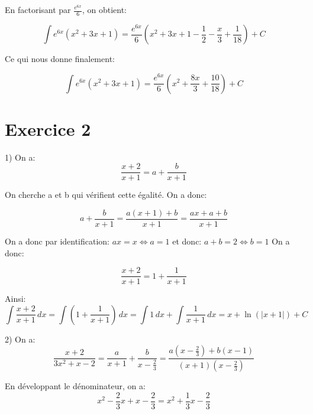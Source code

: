 \documentclass[12pt,a4paper, french]{article}
\begin{document}
En factorisant par \begin{math}
    \frac{e^{6x}}{6}
\end{math}, on obtient:

\begin{equation*}
    \int e^{6x}(x^2+3x+1)=\frac{e^{6x}}{6}\left(x^2+3x+1-\frac{1}{2}-\frac{x}{3}+\frac{1}{18}\right)+C
\end{equation*}

Ce qui nous donne finalement:

\begin{equation*}
    \int e^{6x}(x^2+3x+1)=\frac{e^{6x}}{6}\left(x^2+\frac{8x}{3}+\frac{10}{18}\right)+C
\end{equation*}
 \section*{Exercice 2}
 1) On a: \begin{equation*}
    \frac{x+2}{x+1}=a+\frac{b}{x+1}
 \end{equation*}

 On cherche a et b qui vérifient cette égalité. On a donc:

\begin{equation*}
    a+\frac{b}{x+1}=\frac{a(x+1)+b}{x+1}=\frac{ax+a+b}{x+1}
\end{equation*}

On a donc par identification: \begin{math}
    ax=x \Leftrightarrow a= 1 
\end{math} et donc: \begin{math}
    a+b=2 \Leftrightarrow b=1
\end{math} On a donc: 

\begin{equation*}
    \frac{x+2}{x+1}=1+\frac{1}{x+1}
\end{equation*}

Ainsi: 
\begin{equation*}
    \int \frac{x+2}{x+1} \,dx= \int \left(1+\frac{1}{x+1}\right)\,dx=\int 1\,dx+\int \frac{1}{x+1} \,dx=x+\ln(\left\lvert x+1\right\rvert )+C
\end{equation*}

2) On a:
\begin{equation*}
    \frac{x+2}{3x^2+x-2}=\frac{a}{x+1}+\frac{b}{x-\frac{2}{3}}=\frac{a(x-\frac{2}{3})+b(x-1)}{(x+1)(x-\frac{2}{3})}
\end{equation*}

En développant le dénominateur, on a:
\begin{equation*}
    x^2-\frac{2}{3}x+x-\frac{2}{3}=x^2+\frac{1}{3}x-\frac{2}{3}
\end{equation*}
\end{document}
